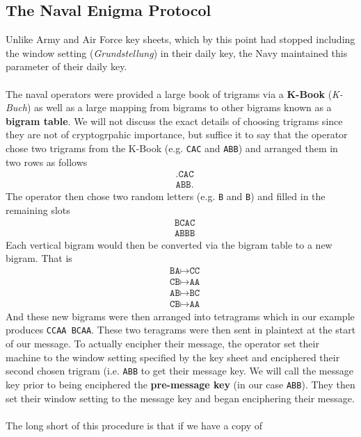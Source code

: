 \subsection{The Naval Enigma Protocol}
Unlike Army and Air Force key sheets, which by this point had stopped
including the window setting (\emph{Grundstellung}) in their daily
key, the Navy maintained this parameter of their daily key.
\\\\The naval operators were provided a large book of trigrams via a
{\bf{{K-Book}}} (\emph{K-Buch}) as well as a large mapping from
bigrams to other bigrams known as a {\bf{bigram table}}. We will not
discuss the exact details of choosing trigrams since they are not of
cryptogrpahic importance, but suffice it to say that the operator
chose two trigrams from the K-Book (e.g. \texttt{CAC} and
\texttt{ABB}) and arranged them in two rows as follows
\begin{align*}
  & \texttt{.CAC} \\
  & \texttt{ABB.}
\end{align*}
The operator then chose two random letters (e.g. \texttt{B} and
\texttt{B}) and filled in the remaining slots
\begin{align*}
  & \texttt{BCAC} \\
  & \texttt{ABBB}
\end{align*}
Each vertical bigram would then be converted via the bigram table to
a new bigram. That is
\begin{align*}
  & \texttt{BA} \mapsto \texttt{CC} \\
  & \texttt{CB} \mapsto \texttt{AA} \\
  & \texttt{AB} \mapsto \texttt{BC} \\
  & \texttt{CB} \mapsto \texttt{AA}
\end{align*}
And these new bigrams were then arranged into tetragrams which in our
example produces \texttt{CCAA BCAA}. These two teragrams were then
sent in plaintext at the start of our message. To actually encipher
their message, the operator set their machine to the window setting
specified by the key sheet and enciphered their second chosen trigram
(i.e. \texttt{ABB} to get their message key. We will call the message
  key prior to being enciphered the {\bf{pre-message key}} (in our
  case \texttt{ABB}). They then set their window setting to the
  message key and began enciphering their message.
  \\\\The long short of this procedure is that if we have a copy of
